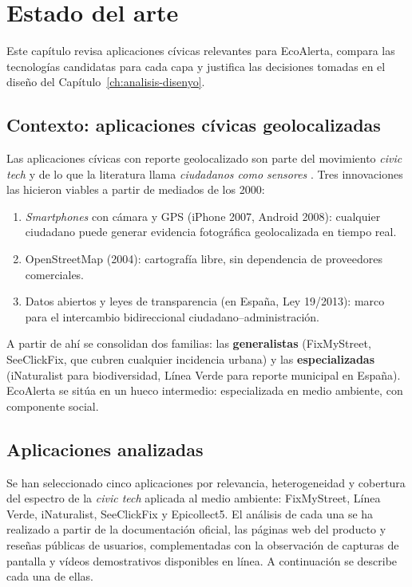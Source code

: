 \chapter{Estado del arte}
\label{ch:estado-del-arte}

Este capítulo revisa aplicaciones cívicas relevantes para EcoAlerta, compara las tecnologías candidatas para cada capa y justifica las decisiones tomadas en el diseño del Capítulo~\ref{ch:analisis-disenyo}.


\section{Contexto: aplicaciones cívicas geolocalizadas}
\label{sec:contexto-apps}

Las aplicaciones cívicas con reporte geolocalizado son parte del movimiento \textit{civic tech} y de lo que la literatura llama \textit{ciudadanos como sensores} \parencite{goodchild2007citizens, haklay2013citizen}. Tres innovaciones las hicieron viables a partir de mediados de los 2000:

\begin{enumerate}
  \item \textit{Smartphones} con cámara y GPS (iPhone 2007, Android 2008): cualquier ciudadano puede generar evidencia fotográfica geolocalizada en tiempo real.
  \item OpenStreetMap (2004): cartografía libre, sin dependencia de proveedores comerciales.
  \item Datos abiertos y leyes de transparencia (en España, Ley 19/2013): marco para el intercambio bidireccional ciudadano--administración.
\end{enumerate}

A partir de ahí se consolidan dos familias: las \textbf{generalistas} (FixMyStreet, SeeClickFix, que cubren cualquier incidencia urbana) y las \textbf{especializadas} (iNaturalist para biodiversidad, Línea Verde para reporte municipal en España). EcoAlerta se sitúa en un hueco intermedio: especializada en medio ambiente, con componente social.


\section{Aplicaciones analizadas}
\label{sec:apps-analizadas}

Se han seleccionado cinco aplicaciones por relevancia, heterogeneidad y cobertura del espectro de la \textit{civic tech} aplicada al medio ambiente: FixMyStreet, Línea Verde, iNaturalist, SeeClickFix y Epicollect5. El análisis de cada una se ha realizado a partir de la documentación oficial, las páginas web del producto y reseñas públicas de usuarios, complementadas con la observación de capturas de pantalla y vídeos demostrativos disponibles en línea. A continuación se describe cada una de ellas.


